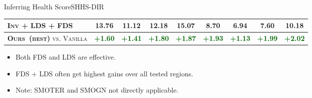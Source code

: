 \begin{frame}{Inferring Health Score}{SHHS-DIR}
\begin{table}[tb]
\begin{center}
{\begin{tabular}{l|cccc|cccc}
					\textsc{Inv} + \textbf{\textsc{LDS}} + \textbf{\textsc{FDS}} & \textbf{13.76} & \textbf{11.12} & \textbf{12.18}  & \textbf{15.07}     & \textbf{8.70}     & 6.94     & \textbf{7.60}      & \textbf{10.18} \\ \midrule\midrule
					\textsc{\textbf{Ours~(best)} vs. Vanilla}   & \textcolor{darkgreen}{\textbf{+1.60}} & \textcolor{darkgreen}{\textbf{+1.41}} & \textcolor{darkgreen}{\textbf{+1.80}} & \textcolor{darkgreen}{\textbf{+1.87}} & \textcolor{darkgreen}{\textbf{+1.93}} & \textcolor{darkgreen}{\textbf{+1.13}} & \textcolor{darkgreen}{\textbf{+1.99}} & \textcolor{darkgreen}{\textbf{+2.02}} \\
					\bottomrule[1.5pt]
				\end{tabular}
			}
		\end{center}
	\end{table}
	\begin{itemize}
		\item Both FDS and LDS are effective.
		\item FDS + LDS often get highest gains over all tested regions.
		\item Note: SMOTER and SMOGN not directly applicable.
	\end{itemize}
\end{frame}

%







